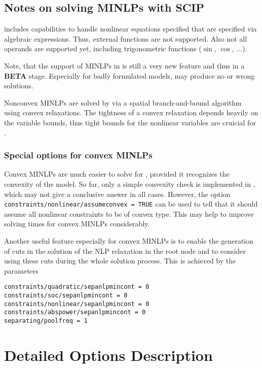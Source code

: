 \subsection{Notes on solving MINLPs with SCIP}

\SCIP includes capabilities to handle nonlinear equations specified that are specified via algebraic expressions.
Thus, external functions are not supported. Also not all \GAMS operands are supported yet, including trigonometric functions ($\sin$, $\cos$, $\ldots$).

Note, that the support of MINLPs in \SCIP is still a very new feature and thus in a \textbf{BETA} stage.
Especially for badly formulated models, \SCIP may produce no or wrong solutions.

Nonconvex MINLPs are solved by \SCIP via a spatial branch-and-bound algorithm using convex relaxations.
The tightness of a convex relaxation depends heavily on the variable bounds, thus tight bounds for the nonlinear variables are cruicial for \SCIP.

\subsubsection{Special options for convex MINLPs}

Convex MINLPs are much easier to solve for \SCIP, provided it recognizes the convexity of the model. So far, only a simple convexity check is implemented in \SCIP, which may not give a conclusive answer in all cases.
However, the option \texttt{constraints/nonlinear/assumeconvex = TRUE} can be used to tell \SCIP that it should assume all nonlinear constraints to be of convex type. This may help to improve solving times for convex MINLPs considerably.

Another useful feature especially for convex MINLPs is to enable the generation of cuts in the solution of the NLP relaxation in the root node and to consider using these cuts during the whole solution process. This is achieved by the parameters
\begin{verbatim}
constraints/quadratic/sepanlpmincont = 0
constraints/soc/sepanlpmincont = 0
constraints/nonlinear/sepanlpmincont = 0
constraints/abspower/sepanlpmincont = 0
separating/poolfreq = 1
\end{verbatim}


\section{Detailed Options Description}

